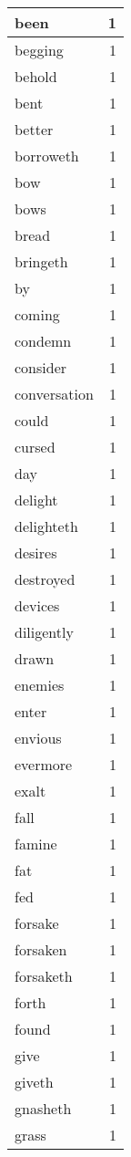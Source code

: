 \begin{center}
\begin{longtable}{l|r}
been & 1 \\ \hline
begging & 1 \\ \hline
behold & 1 \\ \hline
bent & 1 \\ \hline
better & 1 \\ \hline
borroweth & 1 \\ \hline
bow & 1 \\ \hline
bows & 1 \\ \hline
bread & 1 \\ \hline
bringeth & 1 \\ \hline
by & 1 \\ \hline
coming & 1 \\ \hline
condemn & 1 \\ \hline
consider & 1 \\ \hline
conversation & 1 \\ \hline
could & 1 \\ \hline
cursed & 1 \\ \hline
day & 1 \\ \hline
delight & 1 \\ \hline
delighteth & 1 \\ \hline
desires & 1 \\ \hline
destroyed & 1 \\ \hline
devices & 1 \\ \hline
diligently & 1 \\ \hline
drawn & 1 \\ \hline
enemies & 1 \\ \hline
enter & 1 \\ \hline
envious & 1 \\ \hline
evermore & 1 \\ \hline
exalt & 1 \\ \hline
fall & 1 \\ \hline
famine & 1 \\ \hline
fat & 1 \\ \hline
fed & 1 \\ \hline
forsake & 1 \\ \hline
forsaken & 1 \\ \hline
forsaketh & 1 \\ \hline
forth & 1 \\ \hline
found & 1 \\ \hline
give & 1 \\ \hline
giveth & 1 \\ \hline
gnasheth & 1 \\ \hline
grass & 1 \\ \hline

\end{longtable}
\end{center}
